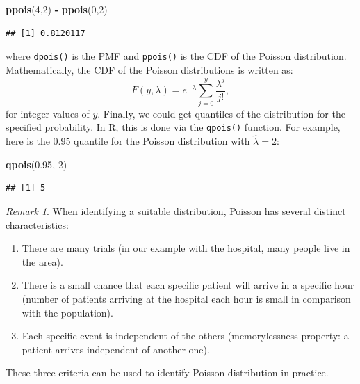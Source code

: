 \documentclass[
]{book}
\newenvironment{Shaded}{\begin{snugshade}}{\end{snugshade}}
\newcommand{\DecValTok}[1]{\textcolor[rgb]{0.00,0.00,0.81}{#1}}
\newcommand{\FloatTok}[1]{\textcolor[rgb]{0.00,0.00,0.81}{#1}}
\newcommand{\FunctionTok}[1]{\textcolor[rgb]{0.13,0.29,0.53}{\textbf{#1}}}
\newcommand{\NormalTok}[1]{#1}
\newcommand{\SpecialCharTok}[1]{\textcolor[rgb]{0.81,0.36,0.00}{\textbf{#1}}}
\providecommand{\tightlist}{%
  \setlength{\itemsep}{0pt}\setlength{\parskip}{0pt}}
\theoremstyle{definition}
\theoremstyle{definition}
\theoremstyle{definition}
\theoremstyle{definition}
\theoremstyle{remark}
\newtheorem*{remark}{Remark}
\begin{document}
\begin{Shaded}
\begin{Highlighting}[]
\FunctionTok{ppois}\NormalTok{(}\DecValTok{4}\NormalTok{,}\DecValTok{2}\NormalTok{) }\SpecialCharTok{{-}} \FunctionTok{ppois}\NormalTok{(}\DecValTok{0}\NormalTok{,}\DecValTok{2}\NormalTok{)}
\end{Highlighting}
\end{Shaded}

\begin{verbatim}
## [1] 0.8120117
\end{verbatim}

where \texttt{dpois()} is the PMF and \texttt{ppois()} is the CDF of the Poisson distribution. Mathematically, the CDF of the Poisson distributions is written as:
\begin{equation}
    F(y, \lambda) = e^{-\lambda} \sum_{j=0}^{y} \frac{\lambda^j }{j!} ,
    \label{eq:PoissonCDF}
\end{equation}
for integer values of \(y\). Finally, we could get quantiles of the distribution for the specified probability. In R, this is done via the \texttt{qpois()} function. For example, here is the 0.95 quantile for the Poisson distribution with \(\hat{\lambda}=2\):

\begin{Shaded}
\begin{Highlighting}[]
\FunctionTok{qpois}\NormalTok{(}\FloatTok{0.95}\NormalTok{, }\DecValTok{2}\NormalTok{)}
\end{Highlighting}
\end{Shaded}

\begin{verbatim}
## [1] 5
\end{verbatim}

\begin{remark}
When identifying a suitable distribution, Poisson has several distinct characteristics:

\begin{enumerate}
\def\labelenumi{\arabic{enumi}.}
\tightlist
\item
  There are many trials (in our example with the hospital, many people live in the area).
\item
  There is a small chance that each specific patient will arrive in a specific hour (number of patients arriving at the hospital each hour is small in comparison with the population).
\item
  Each specific event is independent of the others (memorylessness property: a patient arrives independent of another one).
\end{enumerate}

These three criteria can be used to identify Poisson distribution in practice.
\end{remark}
\end{document}
